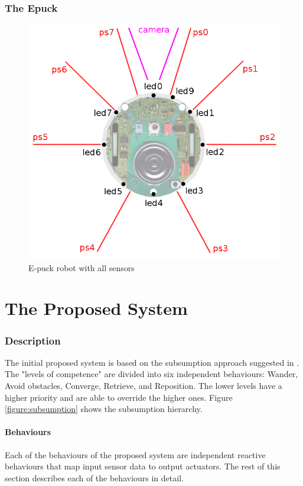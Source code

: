 \documentclass[a4paper]{article}
\begin{document}
\section{The Epuck}

\begin{figure}[H]
\centering
\includegraphics[scale=0.2]{e-puck_sensors_and_leds.png}
\caption{E-puck robot with all sensors}
\end{figure}

\part{The Proposed System}
\label{part:improved-system}

\section{Description}

The initial proposed system is based on the subsumption approach suggested in \cite{assignment}.
The "levels of competence" are divided into six independent behaviours: Wander, Avoid obstacles, Converge, Retrieve, and Reposition.
The lower levels have a higher priority and are able to override the higher ones.
Figure \vref{figure:subsumption} shows the subsumption hierarchy.



\subsection{Behaviours}
Each of the behaviours of the proposed system are independent reactive behaviours that map input sensor data to output actuators. The rest of this section describes each of the behaviours in detail.
\end{document}
